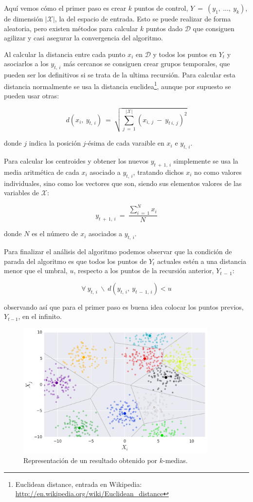 Aquí vemos cómo el primer paso es crear $k$ puntos de control, $Y\:=\:(y_{1},\:...,\:y_{k})$, de dimensión $|\mathcal{X}|$, la del espacio de entrada. Esto se puede realizar de forma aleatoria, pero existen métodos para calcular $k$ puntos dado $\mathcal{D}$ que consiguen agilizar y casi asegurar la convergencia del algoritmo.

Al calcular la distancia entre cada punto $x_{i}$ en $\mathcal{D}$ y todos los puntos en $Y_{t}$ y asociarlos a los $y_{t,\:i}$ más cercanos se consiguen crear grupos temporales, que pueden ser los definitivos si se trata de la ultima recursión. Para calcular esta distancia normalmente se usa la distancia euclidea\footnote{Euclidean distance, entrada en Wikipedia: \url{http://en.wikipedia.org/wiki/Euclidean_distance}}, aunque por supuesto se pueden usar otras:

$$
d(x_{i},\:y_{t,\:i})\:=\:\sqrt{\sum_{j\:=\:1}^{|\mathcal{X}|}(x_{i,\:j}\:-\:y_{t\:i,\:j})^{2}}
$$

\noindent
donde $j$ indica la posición $j$-ésima de cada varaible en $x_{i}$ e $y_{t,\:i}$.

Para calcular los centroides y obtener los nuevos $y_{t\:+\:1,\:i}$ simplemente se usa la media aritmética de cada $x_{i}$ asociado a $y_{t,\:i}$, tratando dichos $x_{i}$ no como valores individuales, sino como los vectores que son, siendo sus elementos valores de las variables de $\mathcal{X}$:

$$
y_{t\:+\:1,\:i}\:=\:\frac{\sum_{i\:=\:1}^{N}x_{i}}{N}
$$

\noindent
donde $N$ es el número de $x_{i}$ asociados a $y_{t,\:i}$.

Para finalizar el análisis del algoritmo podemos observar que la condición de parada del algoritmo es que todos los puntos de $Y_{t}$ actuales estén a una distancia menor que el umbral, $u$, respecto a los puntos de la recursión anterior, $Y_{t\:-\:1}$:

$$
\forall\:y_{t,\:i}\:\backslash\:d(y_{t,\:i},\:y_{t\:-\:1,\:i}) < u
$$

\noindent
observando así que para el primer paso es buena idea colocar los puntos previos, $Y_{t-1}$, en el infinito.

\begin{figure}[ht]
  \centering
  \includegraphics[width=100mm]{figures/ch_02/kmeans_example.png}
  \caption{Representación de un resultado obtenido por $k$-medias.}
  \label{fig:2.3}
\end{figure}

